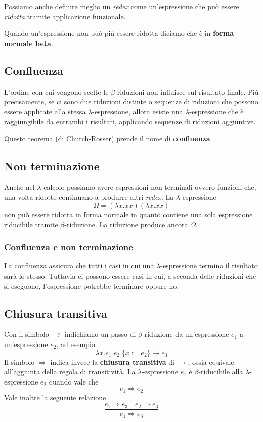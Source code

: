 Possiamo anche definire meglio un \emph{redex} come un'espressione che può essere \emph{ridotta} tramite applicazione
funzionale.

Quando un'espressione non può più essere ridotta diciamo che è in \textbf{forma normale beta}.

\subsection{Confluenza}
L'ordine con cui vengono scelte le $\beta$-riduzioni non influisce sul risultato finale. Più precisamente, se ci sono
due riduzioni distinte o sequenze di riduzioni che possono essere applicate alla stessa $\lambda$-espressione, allora
esiste una $\lambda$-espressione che è raggiungibile da entrambi i risultati, applicando sequenze di riduzioni
aggiuntive.

Questo teorema (di Church-Rosser) prende il nome di \textbf{confluenza}.

\subsection{Non terminazione}
Anche nel $\lambda$-calcolo possiamo avere espressioni non terminali ovvero funzioni che, una volta ridotte continuano
a produrre altri \emph{redex}. La $\lambda$-espressione
\[ \Omega = (\lambda x.xx) (\lambda x.xx) \]
non può essere ridotta in forma normale in quanto contiene una sola espressione riducibile tramite $\beta$-riduzione.
La riduzione produce ancora $\Omega$.

\subsubsection{Confluenza e non terminazione}
La confluenza assicura che tutti i casi in cui una $\lambda$-espressione termina il risultato sarà lo stesso. Tuttavia
ci possono essere casi in cui, a seconda delle riduzioni che si eseguono, l'espressione potrebbe terminare oppure no.

\subsection{Chiusura transitiva}
Con il simbolo $\rightarrow$ indichiamo un passo di $\beta$-riduzione da un'espressione $e_1$ a un'espressione $e_2$,
ad esempio
\[ \lambda x.e_1 \; e_2 \; \{ x := e_2 \} \rightarrow e_3 \]
Il simbolo $\Rightarrow$ indica invece la \textbf{chiusura transitiva} di $\rightarrow$, ossia equivale all'aggiunta
della regola di transitività. La $\lambda$-espressione $e_1$ è $\beta$-riducibile alla $\lambda$-espressione $e_2$
quando vale che
\[ e_1 \Rightarrow e_2 \]
Vale inoltre la seguente relazione
\[ \frac{e_1 \Rightarrow e_3 \quad e_2 \Rightarrow e_3}{e_1 \Rightarrow e_3} \]

